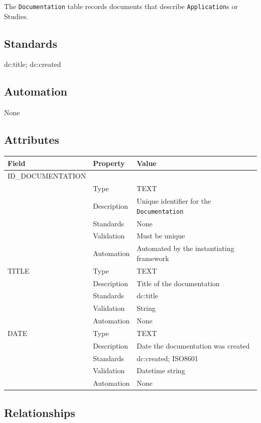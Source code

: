 \documentclass[
]{article}
\newcounter{none}
\begin{document}
The \texttt{Documentation} table records documents that describe
\texttt{Application}s or Studies.

\subsection{Standards}\label{standards-13}

dc:title; dc:created

\subsection{Automation}\label{automation-13}

None

\subsection{Attributes}\label{attributes-13}

{\def\LTcaptype{none} 
\begin{longtable}[]{@{}lll@{}}
\toprule\noalign{}
Field & Property & Value \\
\midrule\noalign{}
\endhead
\bottomrule\noalign{}
\endlastfoot
ID\_DOCUMENTATION & & \\
& Type & TEXT \\
& Description & Unique identifier for the \texttt{Documentation} \\
& Standards & None \\
& Validation & Must be unique \\
& Automation & Automated by the instantiating framework \\
TITLE & Type & TEXT \\
& Description & Title of the documentation \\
& Standards & dc:title \\
& Validation & String \\
& Automation & None \\
DATE & Type & TEXT \\
& Description & Date the documentation was created \\
& Standards & dc:created; ISO8601 \\
& Validation & Datetime string \\
& Automation & None \\
\end{longtable}
}

\subsection{Relationships}\label{relationships-9}
\end{document}
